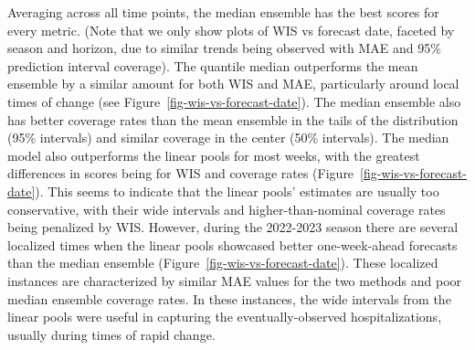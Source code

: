 \documentclass[
]{article}
\begin{document}
Averaging across all time points, the median ensemble has the best
scores for every metric. (Note that we only show plots of WIS vs
forecast date, faceted by season and horizon, due to similar trends
being observed with MAE and 95\% prediction interval coverage). The
quantile median outperforms the mean ensemble by a similar amount for
both WIS and MAE, particularly around local times of change (see
Figure~\ref{fig-wis-vs-forecast-date}). The median ensemble also has
better coverage rates than the mean ensemble in the tails of the
distribution (95\% intervals) and similar coverage in the center (50\%
intervals). The median model also outperforms the linear pools for most
weeks, with the greatest differences in scores being for WIS and
coverage rates (Figure~\ref{fig-wis-vs-forecast-date}). This seems to
indicate that the linear pools' estimates are usually too conservative,
with their wide intervals and higher-than-nominal coverage rates being
penalized by WIS. However, during the 2022-2023 season there are several
localized times when the linear pools showcased better one-week-ahead
forecasts than the median ensemble
(Figure~\ref{fig-wis-vs-forecast-date}). These localized instances are
characterized by similar MAE values for the two methods and poor median
ensemble coverage rates. In these instances, the wide intervals from the
linear pools were useful in capturing the eventually-observed
hospitalizations, usually during times of rapid change.
\end{document}
